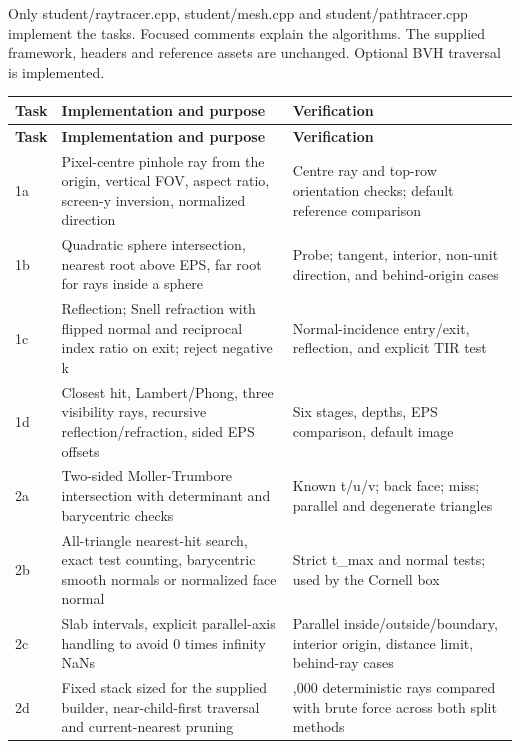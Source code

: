 \documentclass[11pt,a4paper]{article}
\begin{document}
Only student/\allowbreak{}raytracer.cpp, student/\allowbreak{}mesh.cpp and student/\allowbreak{}pathtracer.cpp implement the tasks. Focused comments explain the algorithms. The supplied framework, headers and reference assets are unchanged. Optional BVH traversal is implemented.


{\small\setlength{\tabcolsep}{4pt}\renewcommand{\arraystretch}{1.14}
\begin{longtable}{>{\raggedright\arraybackslash}p{}>{\raggedright\arraybackslash}p{}>{\raggedright\arraybackslash}p{}}
\toprule
\textbf{Task} & \textbf{Implementation and purpose} & \textbf{Verification} \\
\midrule\endfirsthead
\toprule
\textbf{Task} & \textbf{Implementation and purpose} & \textbf{Verification} \\
\midrule\endhead
\bottomrule\endfoot
1a & Pixel-centre pinhole ray from the origin, vertical FOV, aspect ratio, screen-y inversion, normalized direction & Centre ray and top-row orientation checks; default reference comparison \\
1b & Quadratic sphere intersection, nearest root above EPS, far root for rays inside a sphere & Probe; tangent, interior, non-unit direction, and behind-origin cases \\
1c & Reflection; Snell refraction with flipped normal and reciprocal index ratio on exit; reject negative k & Normal-incidence entry/\allowbreak{}exit, reflection, and explicit TIR test \\
1d & Closest hit, Lambert/\allowbreak{}Phong, three visibility rays, recursive reflection/\allowbreak{}refraction, sided EPS offsets & Six stages, depths, EPS comparison, default image \\
2a & Two-sided Moller-Trumbore intersection with determinant and barycentric checks & Known t/\allowbreak{}u/\allowbreak{}v; back face; miss; parallel and degenerate triangles \\
2b & All-triangle nearest-hit search, exact test counting, barycentric smooth normals or normalized face normal & Strict t\_max and normal tests; used by the Cornell box \\
2c & Slab intervals, explicit parallel-axis handling to avoid 0 times infinity NaNs & Parallel inside/\allowbreak{}outside/\allowbreak{}boundary, interior origin, distance limit, behind-ray cases \\
2d & Fixed stack sized for the supplied builder, near-child-first traversal and current-nearest pruning & 12,000 deterministic rays compared with brute force across both split methods \\

\end{longtable}}
\end{document}
